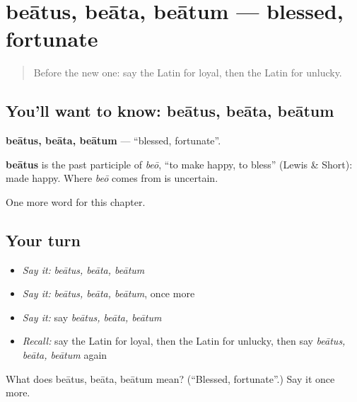\section[beātus, beāta, beātum]{beātus, beāta, beātum — blessed, fortunate}

\label{lesson:LA-C243-beatus}



\begin{quote}
Before the new one: say the Latin for loyal, then the Latin for unlucky.
\end{quote}

\subsection*{You'll want to know: beātus, beāta, beātum}
\textbf{beātus, beāta, beātum} — \textquotedblleft{}blessed, fortunate\textquotedblright{}.

\begin{cousinweb}
\textbf{beātus} is the past participle of \emph{beō}, \textquotedblleft{}to make happy, to bless\textquotedblright{} (Lewis \& Short): made happy. Where \emph{beō} comes from is uncertain.
\end{cousinweb}

\begin{grammarlens}[title={What you've built}]
One more word for this chapter.
\end{grammarlens}

\subsection*{Your turn}
\begin{itemize}
\raggedright
  \item \emph{Say it:} \emph{beātus, beāta, beātum}
  \item \emph{Say it:} \emph{beātus, beāta, beātum}, once more
  \item \emph{Say it:} say \emph{beātus, beāta, beātum}
  \item \emph{Recall:} say the Latin for loyal, then the Latin for unlucky, then say \emph{beātus, beāta, beātum} again
\end{itemize}

\begin{tcolorbox}[breakable,colback=teal!4,colframe=teal!35!black,title={Before you move on}]
What does beātus, beāta, beātum mean? (\textquotedblleft{}Blessed, fortunate\textquotedblright{}.) Say it once more.
\end{tcolorbox}
